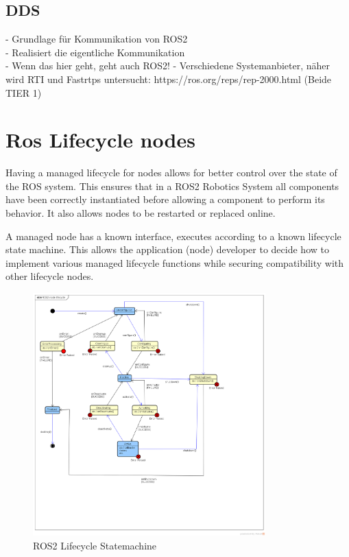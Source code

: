 	

	\subsection{DDS}
	\label{Grundlagen:DDS}
		- Grundlage für Kommunikation von ROS2\\
		- Realisiert die eigentliche Kommunikation\\
		- Wenn das hier geht, geht auch ROS2!
		- Verschiedene Systemanbieter, näher wird RTI und Fastrtps untersucht: https://ros.org/reps/rep-2000.html  (Beide TIER 1)
		
	
	\section{Ros Lifecycle nodes}
	\label{Grundlagen:ROS2:Lifecycle}
	Having a managed lifecycle for nodes allows for better control over the state of the ROS system. This ensures that in a ROS2 Robotics System all components have been correctly instantiated before allowing a component to perform its behavior. It also allows nodes to be restarted or replaced online.

	A managed node has a known interface, executes according to a known lifecycle state machine. This allows the application (node) developer to decide how to implement various managed lifecycle functions while securing compatibility with other lifecycle nodes.

	\begin{figure}[H]
		\centering
		\includegraphics[width=0.8\textwidth]{"Bilder/ros_lifecycle.png"}
		\caption{ROS2 Lifecycle Statemachine \cite{ros2Tutorials}}
		\label{fig:Background:Ros2Actions}					
	\end{figure}



